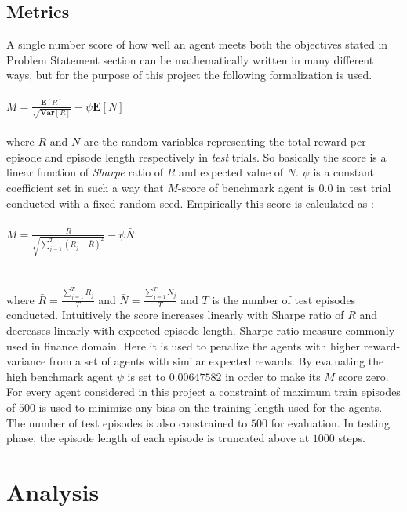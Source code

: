 \documentclass{svproc}
\begin{document}
\subsection*{Metrics}
A single number score of how well an agent meets both the objectives stated in Problem Statement section can be mathematically written in many different ways, but for the purpose of this project the following formalization is used.\\\\
$M = \frac{\mathbf{E}[R]}{\sqrt{\mathbf{Var}[R]}} - \psi \mathbf{E}[N] $\\\\
where $R$ and $N$ are the random variables representing the total reward per episode and episode length respectively in \textit{test} trials. So basically the score is a linear function of \textit{Sharpe} ratio of $R$ and expected value of $N$. $\psi$ is a constant coefficient set in such a way that $M$-score of benchmark agent is 0.0 in test trial conducted with a fixed random seed. Empirically this score is calculated as :\\\\
$M = \frac{\bar{R}}{\sqrt{\sum_{j=1}^{T} \left( R_j - \bar{R}\right)^2}} - \psi \bar{N}$\\\\\\
where $\bar{R} = \frac{\sum_{j=1}^{T} R_j}{T}$ and $\bar{N} = \frac{\sum_{j=1}^{T} N_j}{T}$ and $T$ is the number of test episodes conducted. Intuitively the score increases linearly with Sharpe ratio of $R$ and decreases linearly with expected episode length. Sharpe ratio measure commonly used in finance domain. Here it is used to penalize the agents with higher reward-variance from a set of agents with similar expected rewards.
By evaluating the high benchmark agent $\psi$ is set to $0.00647582$ in order to make its $M$ score zero. For every agent considered in this project a constraint of maximum train episodes of $500$ is used to minimize any bias on the training length used for the agents. The number of test episodes is also constrained to $500$ for evaluation. In testing phase, the episode length of each episode is truncated above at $1000$ steps.
\section{Analysis}
\end{document}
